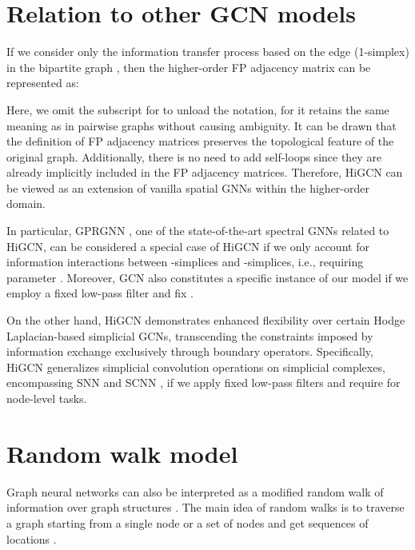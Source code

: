 \documentclass[letterpaper]{article} \usepackage{aaai24}
\theoremstyle{plain}
\theoremstyle{definition}
\theoremstyle{remark}
\begin{document}
\section{Relation to other GCN models}
\label{appendix:relation_to_GCNs}

If we consider only the information transfer process based on the edge (1-simplex) in the bipartite graph , then the higher-order FP adjacency matrix can be represented as:

Here, we omit the subscript for  to unload the notation, for it retains the same meaning as in pairwise graphs without causing ambiguity.
It can be drawn that the definition of FP adjacency matrices preserves the topological feature of the original graph. 
Additionally, there is no need to add self-loops since they are already implicitly included in the FP adjacency matrices.
Therefore, HiGCN can be viewed as an extension of vanilla spatial GNNs within the higher-order domain.





In particular, GPRGNN \cite{GPRGNN}, one of the state-of-the-art spectral GNNs related to HiGCN, can be considered a special case of HiGCN if we only account for information interactions between -simplices and -simplices, i.e., requiring parameter . Moreover, GCN \cite{GCN} also constitutes a specific instance of our model if we employ a fixed low-pass filter and fix .

On the other hand, HiGCN demonstrates enhanced flexibility over certain Hodge Laplacian-based simplicial GCNs, transcending the constraints imposed by information exchange exclusively through boundary operators.
Specifically, HiGCN generalizes simplicial convolution operations on simplicial complexes, encompassing SNN \cite{SNN2020} and SCNN \cite{SCNN2022}, if we apply fixed low-pass filters and require  for node-level tasks.










\section{Random walk model}
\label{appendix:RW}

Graph neural networks can also be interpreted as a modified random walk of information over graph structures \cite{APPNP}. 
The main idea of random walks is to traverse a graph starting from a single node or a set of nodes and get sequences of locations \cite{HoRW}. 
\end{document}
